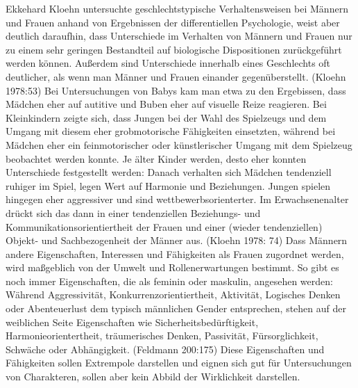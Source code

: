 Ekkehard Kloehn untersuchte geschlechtstypische Verhaltensweisen bei Männern und Frauen anhand von Ergebnissen der differentiellen Psychologie, weist aber deutlich daraufhin, dass Unterschiede im Verhalten von Männern und Frauen nur zu einem sehr geringen Bestandteil auf biologische Dispositionen zurückgeführt werden können. Außerdem sind Unterschiede innerhalb eines Geschlechts oft deutlicher, als wenn man Männer und Frauen einander gegenüberstellt. (Kloehn 1978:53) 
Bei Untersuchungen von Babys kam man etwa zu den Ergebissen, dass Mädchen eher auf autitive und Buben eher auf visuelle Reize reagieren. Bei Kleinkindern zeigte sich, dass Jungen bei der Wahl des Spielzeugs und dem Umgang mit diesem eher grobmotorische Fähigkeiten einsetzten, während bei Mädchen eher ein feinmotorischer oder künstlerischer Umgang mit dem Spielzeug beobachtet werden konnte. Je älter Kinder werden, desto eher konnten Unterschiede festgestellt werden: Danach verhalten sich Mädchen tendenziell ruhiger im Spiel, legen Wert auf Harmonie und Beziehungen. Jungen spielen hingegen eher aggressiver und sind wettbewerbsorienterter. Im Erwachsenenalter drückt sich das dann in einer tendenziellen Beziehungs- und Kommunikationsorientiertheit der Frauen und einer (wieder tendenziellen) Objekt- und Sachbezogenheit der Männer aus. (Kloehn 1978: 74) Dass Männern andere Eigenschaften, Interessen und Fähigkeiten als Frauen zugordnet werden, wird maßgeblich von der Umwelt und Rollenerwartungen bestimmt. So gibt es noch immer Eigenschaften, die als feminin oder maskulin, angesehen werden: Während Aggressivität, Konkurrenzorientiertheit, Aktivität, Logisches Denken oder Abenteuerlust dem typisch männlichen Gender entsprechen, stehen auf der weiblichen Seite Eigenschaften wie Sicherheitsbedürftigkeit, Harmonieorientertheit, träumerisches Denken, Passivität, Fürsorglichkeit, Schwäche oder Abhängigkeit. (Feldmann 200:175) Diese Eigenschaften und Fähigkeiten sollen Extrempole darstellen und eignen sich gut für Untersuchungen von Charakteren, sollen aber kein Abbild der Wirklichkeit darstellen.

